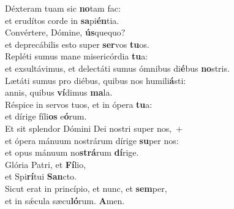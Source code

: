 \evenverse Déxteram tuam sic \textbf{no}tam fac:~\*\\
\evenverse et erudítos corde in \textbf{sa}pi\textbf{én}tia.\\
\oddverse Convértere, Dómine, \textbf{ús}quequo?~\*\\
\oddverse et deprecábilis esto super \textbf{ser}vos \textbf{tu}os.\\
\evenverse Repléti sumus mane misericórdia \textbf{tu}a:~\*\\
\evenverse et exsultávimus, et delectáti sumus ómnibus di\textbf{é}bus \textbf{no}stris.\\
\oddverse Lætáti sumus pro diébus, quibus nos humili\textbf{á}sti:~\*\\
\oddverse annis, quibus \textbf{ví}dimus \textbf{ma}la.\\
\evenverse Réspice in servos tuos, et in ópera \textbf{tu}a:~\*\\
\evenverse et dírige fíli\textbf{os} e\textbf{ó}rum.\\
\oddverse Et sit splendor Dómini Dei nostri super nos,~+\\
\oddverse  et ópera mánuum nostrárum dírige \textbf{su}per nos:~\*\\
\oddverse et opus mánuum no\textbf{strá}rum \textbf{dí}rige.\\
\evenverse Glória Patri, et \textbf{Fí}lio,~\*\\
\evenverse et Spi\textbf{rí}tui \textbf{San}cto.\\
\oddverse Sicut erat in princípio, et nunc, et \textbf{sem}per,~\*\\
\oddverse et in sǽcula sæcu\textbf{ló}rum. \textbf{A}men.\\
